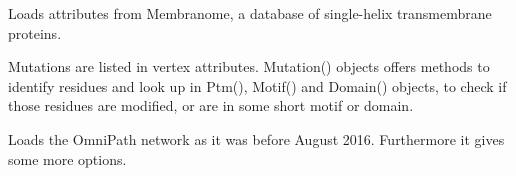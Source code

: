 \documentclass[letterpaper,10pt,english]{sphinxmanual}
\begin{document}
\begin{fulllineitems}
\begin{fulllineitems}
\end{fulllineitems}


\begin{fulllineitems}
\label{\detokenize{main:pypath.main.PyPath.load_membranome_attrs}}
Loads attributes from Membranome, a database of single-helix
transmembrane proteins.

\end{fulllineitems}


\begin{fulllineitems}
\label{\detokenize{main:pypath.main.PyPath.load_mimp_dmi}}
\end{fulllineitems}


\begin{fulllineitems}
\label{\detokenize{main:pypath.main.PyPath.load_mutations}}
Mutations are listed in vertex attributes. Mutation() objects
offers methods to identify residues and look up in Ptm(), Motif()
and Domain() objects, to check if those residues are
modified, or are in some short motif or domain.

\end{fulllineitems}


\begin{fulllineitems}
\label{\detokenize{main:pypath.main.PyPath.load_negatives}}
\end{fulllineitems}


\begin{fulllineitems}
\label{\detokenize{main:pypath.main.PyPath.load_old_omnipath}}
Loads the OmniPath network as it was before August 2016.
Furthermore it gives some more options.


\end{fulllineitems}
\end{fulllineitems}
\end{document}
